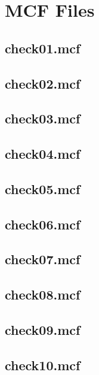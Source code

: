 \section{MCF Files}

\label{sec:mcf}

\subsection{check01.mcf}


\subsection{check02.mcf}


\subsection{check03.mcf}


\subsection{check04.mcf}


\subsection{check05.mcf}


\subsection{check06.mcf}


\subsection{check07.mcf}


\subsection{check08.mcf}


\subsection{check09.mcf}


\subsection{check10.mcf}

